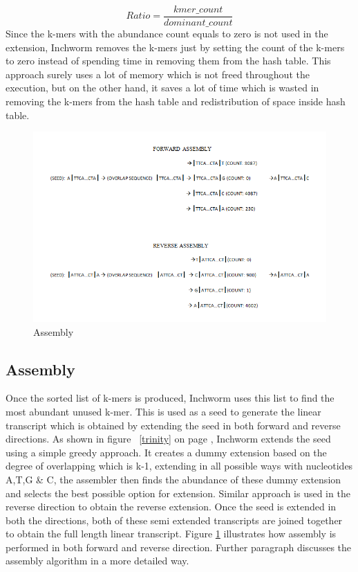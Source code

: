 \label{key}\documentclass[bachinf, english ,zihtitle,final,hyperref,utf8]{zihpub}
\begin{document}
\begin{equation}
Ratio = \frac{kmer\_count}{dominant\_count}
\label{eq2}
\end{equation}
Since the k-mers with the abundance count equals to zero is not used in the extension, Inchworm removes the k-mers just by setting the count of the k-mers to zero instead of spending time in removing them from the hash table. This approach surely uses a lot of memory which is not freed throughout the execution, but on the other hand, it saves a lot of time which is wasted in removing the k-mers from the hash table and redistribution of space inside hash table.
\begin{figure}[h]
\center
\includegraphics[scale=0.7]{assembly}
\caption{Assembly}
\label{assemble}
\end{figure}
\subsection{Assembly}
Once the sorted list of k-mers is produced, Inchworm uses this list to find the most abundant unused k-mer. This is used as a seed to generate the linear transcript which is obtained by extending the seed in both forward and reverse directions. As shown in figure ~\ref{trinity} on page \pageref{trinity}, Inchworm extends the seed using a simple greedy approach. It creates a dummy extension based on the degree of overlapping which is k-1, extending in all possible ways with nucleotides A,T,G \& C, the assembler then finds the abundance of these dummy extension and selects the best possible option for extension. Similar approach is used in the reverse direction to obtain the reverse extension. Once the seed is extended in both the directions, both of these semi extended transcripts are joined together to obtain the full length linear transcript. Figure \ref{assemble} illustrates how assembly is performed in both forward and reverse direction. Further paragraph discusses the assembly algorithm in a more detailed way.
\end{document}
